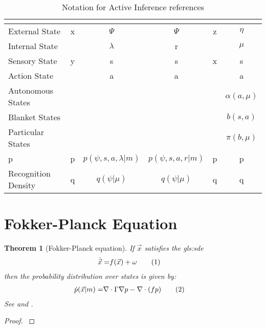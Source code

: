 \documentclass[]{article}
\newcommand\numberthis{\addtocounter{equation}{1}\tag{\theequation}}
\newtheorem{thm}{Theorem}
\begin{document}
\begin{table}[H]
	\begin{center}
		\caption{Notation for Active Inference references}
		\begin{tabular}{|l|c|c|c|c|c|}\hline
			&\cite{beal2003variational}&\cite{friston_life_2013}&\cite{friston2016therefore}&\cite{Blei2017}&\cite{friston2022free,Parr2022Active}\\ \hline
			External State&x&$\Psi$&$\Psi$&z&$\eta$\\ \hline
			Internal State&&$\lambda$&r&&$\mu$\\ \hline
			Sensory State&y&s&s&x&s\\ \hline
			Action State&&a&a&&a\\ \hline
			Autonomous States&&&&& $\alpha(a,\mu)$\\\hline
			Blanket States&&&&&$b(s,a)$\\ \hline
			Particular States&&&&&$\pi(b,\mu)$\\ \hline
			p&p&$p(\psi,s,a,\lambda\vert m)$&$p(\psi,s,a,r\vert m)$&p&p\\ \hline
			Recognition Density&q&$q(\psi\vert \mu)$&$q(\psi\vert \mu)$&q&q\\ \hline
		\end{tabular}
	\end{center}
\end{table}

\section{Fokker-Planck Equation}

\begin{thm}[Fokker-Planck equation]
	If $\vec{x}$ satisfies the \gls{gls:sde}
	\begin{align*}
		\dot{\vec{x}} =& f(\vec{x}) + \omega \numberthis \label{eq:dynamics}
	\end{align*}
	then the probability distribution over states is given by:
	\begin{align*}
		\dot{p}(\vec{x}\vert m) =& \nabla \cdot \Gamma \nabla p -\nabla \cdot(f p) \numberthis \label{eq:fokker:planck}
	\end{align*}
	See \cite[(2.2)]{friston_life_2013} and  \cite[Chapter 33]{cvitanovic2005chaos}.
\end{thm}

\begin{proof}
	\cite[Section 33.3]{cvitanovic2005chaos}
\end{proof}
\end{document}
